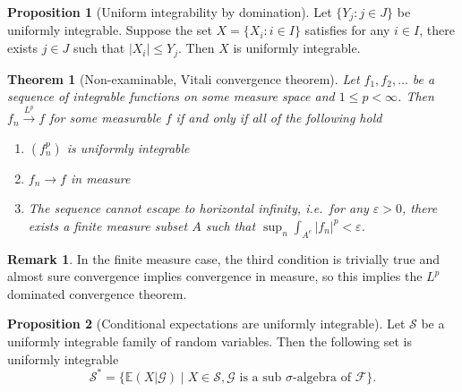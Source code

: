 \documentclass[parskip=full]{article}
\newtheorem{theorem}{Theorem}[section]
\theoremstyle{definition}
\newtheorem{proposition}{Proposition}[section]
\newtheorem*{remark}{Remark}
\newcommand{\1}{\mathbbm{1}}
\newcommand{\E}{\mathbb{E}}
\begin{document}
\begin{proposition}[Uniform integrability by domination] \label{Uniform integrability by domination}
  Let $\{Y_j : j \in J\}$ be uniformly integrable. Suppose the set $X = \{X_i : i \in I\}$ satisfies for any $i \in I$, there exists $j \in J$ such that $|X_i| \leq Y_j$. Then $X$ is uniformly integrable.
\end{proposition}

\begin{theorem}[Non-examinable, Vitali convergence theorem]
  Let $f_1, f_2, \ldots$ be a sequence of integrable functions on some measure space and $1 \leq p < \infty$. Then $f_n \xrightarrow{L^p} f$ for some measurable $f$ if and only if all of the following hold
  \begin{enumerate}
    \item $(f_n^p)$ is uniformly integrable
    \item $f_n \to f$ in measure
    \item The sequence cannot escape to horizontal infinity, i.e.\ for any $\varepsilon > 0$, there exists a finite measure subset $A$ such that $\sup_n \int_{A^c} |f_n|^p < \varepsilon$.
  \end{enumerate}
\end{theorem}

\begin{remark}
  In the finite measure case, the third condition is trivially true and almost sure convergence implies convergence in measure, so this implies the $L^p$ dominated convergence theorem.
\end{remark}

\begin{proposition}[Conditional expectations are uniformly integrable] \label{Conditional expectations are uniformly integrable}
  Let $\mathcal{S}$ be a uniformly integrable family of random variables. Then the following set is uniformly integrable
  \[
    \mathcal{S}^* = \{\E(X|\mathcal{G}) \mid X \in \mathcal{S},\mathcal{G} \text{ is a sub $\sigma$-algebra of } \mathcal{F}\}.
  \]
\end{proposition}
\end{document}

